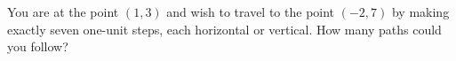 You are at the point $(1,3)$ and wish to travel to the point $(-2,7)$ by making exactly seven one-unit steps, each horizontal or vertical. How many paths could you follow?
